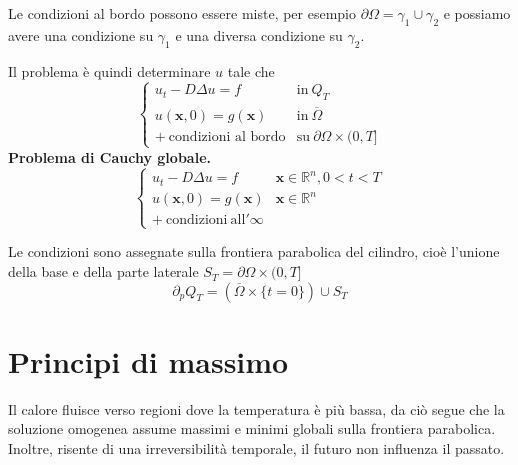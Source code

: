 \documentclass[10pt,a4paper,twoside,openright]{book}
\begin{document}
Le condizioni al bordo possono essere miste, per esempio $\partial \Omega =\gamma _{1} \cup \gamma _{2}$ e possiamo avere una condizione su $\gamma _{1}$ e una diversa condizione su $\gamma _{2}$.

Il problema è quindi determinare $u$ tale che
\begin{equation*}
\begin{cases}
u_{t} -D\Delta u=f & \text{in} \ Q_{T}\\
u(\mathbf{x},0) =g(\mathbf{x}) & \text{in} \ \overline{\Omega }\\
+\ \text{condizioni al bordo} & \text{su} \ \partial \Omega \times ( 0,T]
\end{cases}
\end{equation*}
\textbf{Problema di Cauchy globale.}
\begin{equation*}
\begin{cases}
u_{t} -D\Delta u=f & \mathbf{x} \in \mathbb{R}^{n},0< t< T\\
u(\mathbf{x},0) =g(\mathbf{x}) & \mathbf{x} \in \mathbb{R}^{n}\\
\mathrm{+\ condizioni\ all'\infty } & 
\end{cases}
\end{equation*}
\begin{definition}
 Le condizioni sono assegnate sulla frontiera parabolica del cilindro, cioè l'unione della base e della parte laterale $S_{T} =\partial \Omega \times ( 0,T]$
\begin{equation*}
\partial _{p} Q_{T} =(\overline{\Omega } \times \{t=0\}) \cup S_{T}
\end{equation*}
\end{definition}
\section{Principi di massimo}

Il calore fluisce verso regioni dove la temperatura è più bassa, da ciò segue che la soluzione omogenea assume massimi e minimi globali sulla frontiera parabolica. Inoltre, risente di una irreversibilità temporale, il futuro non influenza il passato.
\end{document}
